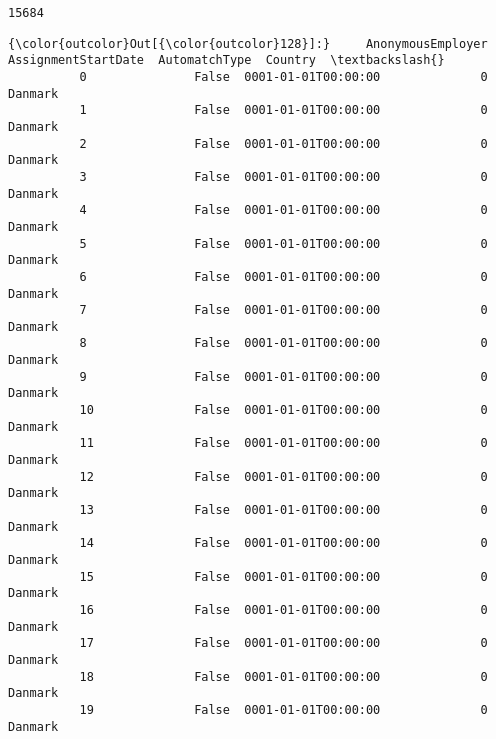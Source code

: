 \documentclass[11pt]{article}
\begin{document}
    \begin{Verbatim}[commandchars=\\\{\}]
15684

    \end{Verbatim}

\begin{Verbatim}[commandchars=\\\{\}]
{\color{outcolor}Out[{\color{outcolor}128}]:}     AnonymousEmployer  AssignmentStartDate  AutomatchType  Country  \textbackslash{}
          0               False  0001-01-01T00:00:00              0  Danmark   
          1               False  0001-01-01T00:00:00              0  Danmark   
          2               False  0001-01-01T00:00:00              0  Danmark   
          3               False  0001-01-01T00:00:00              0  Danmark   
          4               False  0001-01-01T00:00:00              0  Danmark   
          5               False  0001-01-01T00:00:00              0  Danmark   
          6               False  0001-01-01T00:00:00              0  Danmark   
          7               False  0001-01-01T00:00:00              0  Danmark   
          8               False  0001-01-01T00:00:00              0  Danmark   
          9               False  0001-01-01T00:00:00              0  Danmark   
          10              False  0001-01-01T00:00:00              0  Danmark   
          11              False  0001-01-01T00:00:00              0  Danmark   
          12              False  0001-01-01T00:00:00              0  Danmark   
          13              False  0001-01-01T00:00:00              0  Danmark   
          14              False  0001-01-01T00:00:00              0  Danmark   
          15              False  0001-01-01T00:00:00              0  Danmark   
          16              False  0001-01-01T00:00:00              0  Danmark   
          17              False  0001-01-01T00:00:00              0  Danmark   
          18              False  0001-01-01T00:00:00              0  Danmark   
          19              False  0001-01-01T00:00:00              0  Danmark   
          

\end{Verbatim}
\end{document}
